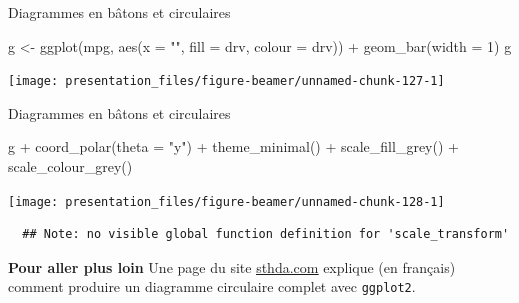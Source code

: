 \documentclass[12pt,ignorenonframetext,handout,]{beamer}
\newenvironment{Shaded}{}{}
\newcommand{\DataTypeTok}[1]{#1}
\newcommand{\DecValTok}[1]{#1}
\newcommand{\KeywordTok}[1]{\textcolor[rgb]{0.00,0.00,1.00}{#1}}
\newcommand{\NormalTok}[1]{#1}
\newcommand{\OperatorTok}[1]{#1}
\newcommand{\StringTok}[1]{\textcolor[rgb]{0.00,0.50,0.50}{#1}}
\renewenvironment{Shaded}{\begin{snugshade}}{\end{snugshade}}
\newcommand{\intertitre}[1]{\textcolor{redInsee}{\textbf{#1}}}
\begin{document}
\begin{frame}[fragile]{Diagrammes en bâtons et circulaires}
\protect\hypertarget{diagrammes-en-batons-et-circulaires-6}{}

\footnotesize \center

\begin{Shaded}
\begin{Highlighting}[]
\NormalTok{g <-}\StringTok{ }\KeywordTok{ggplot}\NormalTok{(mpg, }\KeywordTok{aes}\NormalTok{(}\DataTypeTok{x =} \StringTok{""}\NormalTok{, }\DataTypeTok{fill =}\NormalTok{ drv, }\DataTypeTok{colour =}\NormalTok{ drv)) }\OperatorTok{+}\StringTok{ }
\StringTok{  }\KeywordTok{geom_bar}\NormalTok{(}\DataTypeTok{width =} \DecValTok{1}\NormalTok{)}
\NormalTok{g}
\end{Highlighting}
\end{Shaded}

\texttt{[image: presentation\_files/figure-beamer/unnamed-chunk-127-1]}

\end{frame}

\begin{frame}[fragile]{Diagrammes en bâtons et circulaires}
\protect\hypertarget{diagrammes-en-batons-et-circulaires-7}{}

\footnotesize \center

\begin{Shaded}
\begin{Highlighting}[]
\NormalTok{g }\OperatorTok{+}\StringTok{ }\KeywordTok{coord_polar}\NormalTok{(}\DataTypeTok{theta =} \StringTok{"y"}\NormalTok{) }\OperatorTok{+}\StringTok{ }\KeywordTok{theme_minimal}\NormalTok{() }\OperatorTok{+}
\StringTok{  }\KeywordTok{scale_fill_grey}\NormalTok{() }\OperatorTok{+}\StringTok{ }\KeywordTok{scale_colour_grey}\NormalTok{()}
\end{Highlighting}
\end{Shaded}

\texttt{[image: presentation\_files/figure-beamer/unnamed-chunk-128-1]}

\begin{verbatim}
  ## Note: no visible global function definition for 'scale_transform'
\end{verbatim}

\pause \raggedright \small

\intertitre{Pour aller plus loin} Une page du site
\href{http://www.sthda.com/french/wiki/ggplot2-graphique-en-camembert-guide-de-demarrage-rapide-logiciel-r-et-visualisation-de-donnees}{\underline{sthda.com}}
explique (en français) comment produire un diagramme circulaire complet
avec \texttt{ggplot2}.

\end{frame}
\end{document}
